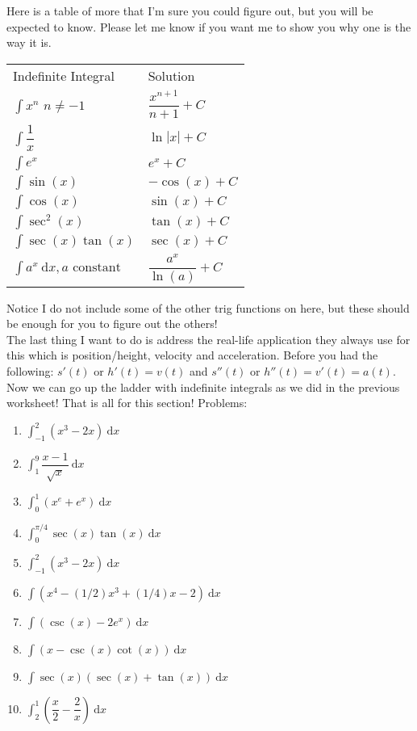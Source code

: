 \documentclass[10pt]{article}
\newcommand{\ds}{\displaystyle}
\newcommand{\dx}{\:\mathrm{d}x}
\theoremstyle{Theorem}
\theoremstyle{definition}
\theoremstyle{remark}
\theoremstyle{custom}
\begin{document}
Here is a table of more that I'm sure you could figure out, but you will be expected to know. Please let me know if you want me to show you why one is the way it is.
\begin{center}
\begin{tabular}{ | m{6em} | m{6em}|} 
\hline
Indefinite Integral & Solution\\
$\int x^n$ $n\neq -1$ & $\dfrac{x^{n+1}}{n+1}+C$\\
\hline
$\int \dfrac{1}{x}$ & $\ln|x|+C$\\
\hline
$\int e^x$ & $e^x+C$\\
\hline
$\int \sin(x)$ & $-\cos(x)+C$\\
\hline
$\int \cos(x)$ & $\sin(x)+C$\\
\hline
$\int \sec^2(x)$ & $\tan(x)+C$\\
\hline
$\int \sec(x)\tan(x)$ & $\sec(x)+C$\\
\hline
$\int a^x \dx, a\text{ constant}$ & $\dfrac{a^x}{\ln(a)}+C$
\end{tabular}
\end{center}
Notice I do not include some of the other trig functions on here, but these should be enough for you to figure out the others!\\
The last thing I want to do is address the real-life application they always use for this which is position/height, velocity and acceleration. Before you had the following: $s'(t)$ or $h'(t) = v(t)$ and $s''(t)$ or $h''(t)=v'(t)=a(t)$.  Now we can go up the ladder with indefinite integrals as we did in the previous worksheet! That is all for this section!
\newpage 
\noindent Problems: 
\begin{enumerate}[1.]
\item $\ds \int_{-1}^2 (x^3-2x)\dx$
\item $\ds \int_{1}^9 \dfrac{x-1}{\sqrt{x}}\dx$
\item $\ds \int_{0}^1 (x^e+e^x)\dx$
\item $\ds \int_{0}^{\pi/4} \sec(x)\tan(x)\dx$
\item $\ds \int_{-1}^2 (x^3-2x)\dx$
\item $\ds \int (x^4-(1/2)x^3+(1/4)x-2)\dx$
\item $\ds \int (\csc(x)-2e^x)\dx$
\item $\ds \int (x-\csc(x)\cot(x))\dx$
\item $\ds \int \sec(x)(\sec(x)+\tan(x))\dx$
\item $\ds \int_{2}^1 (\dfrac{x}{2}-\dfrac{2}{x})\dx$
\end{enumerate}
\end{document}
